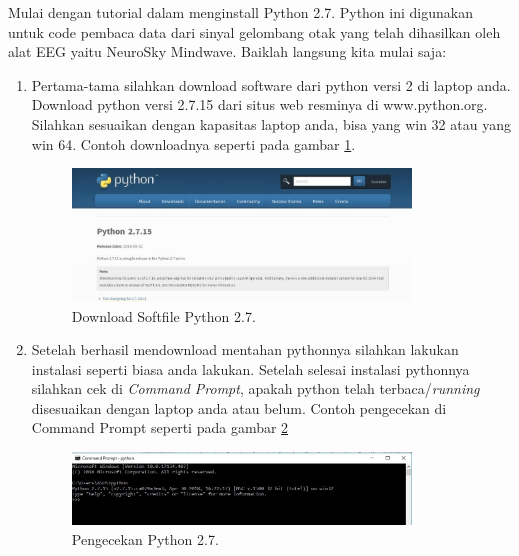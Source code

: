 Mulai dengan tutorial dalam menginstall Python 2.7. Python ini digunakan untuk code pembaca data dari sinyal gelombang otak yang telah dihasilkan oleh alat EEG yaitu NeuroSky Mindwave. Baiklah langsung kita mulai saja:
\begin{enumerate}
\item Pertama-tama silahkan download software dari python versi 2 di laptop anda. Download python versi 2.7.15 dari situs web resminya di www.python.org. Silahkan sesuaikan dengan kapasitas laptop anda, bisa yang win 32 atau yang win 64. Contoh downloadnya seperti pada gambar \ref{fig:python27}.
\begin{figure}[!htbp]
	\centerline{\includegraphics[width=0.85\textwidth]{figures/8/python27.jpg}}
	\caption{Download Softfile Python 2.7.}
	\label{fig:python27}
\end{figure}

\item Setelah berhasil mendownload mentahan pythonnya silahkan lakukan instalasi seperti biasa anda lakukan. Setelah selesai instalasi pythonnya silahkan cek di \textit{Command Prompt}, apakah python telah terbaca/\textit{running} disesuaikan dengan laptop anda atau belum. Contoh pengecekan di Command Prompt seperti pada gambar \ref{fig:cek_python27}
\begin{figure}[!htbp]
	\centerline{\includegraphics[width=0.85\textwidth]{figures/8/cek_python27.jpg}}
	\caption{Pengecekan Python 2.7.}
	\label{fig:cek_python27}
\end{figure}


\end{enumerate}

